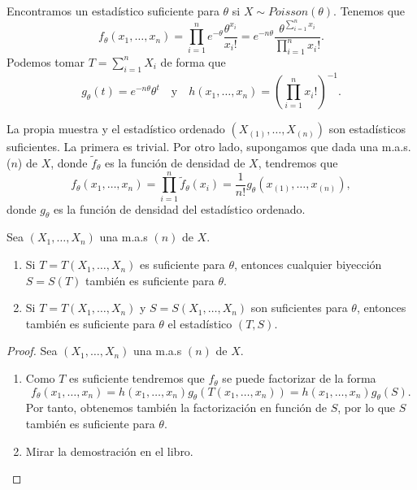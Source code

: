 \begin{eg}[Poisson]
Encontramos un estadístico suficiente para $\displaystyle \theta $ si $\displaystyle X \sim Poisson\left(\theta \right) $. Tenemos que 
\[f_{\theta}\left(x_{1}, \ldots, x_{n}\right)=\prod^{n}_{i=1}e^{-\theta}\frac{\theta^{x_{i}}}{x_{i}!} = e^{-n\theta}\frac{\theta^{\sum^{n}_{i=1}x_{i}}}{\prod^{n}_{i=1}x_{i}!} .\]
Podemos tomar $\displaystyle T = \sum^{n}_{i= 1}X_{i} $ de forma que
\[g_{\theta}\left(t\right)=e^{-n\theta}\theta^{t} \quad \text{y} \quad h\left(x_{1}, \ldots, x_{n}\right)=\left(\prod^{n}_{i=1}x_{i}!\right)^{-1} .\]
\end{eg}
\begin{observation}
	La propia muestra y el estadístico ordenado $\displaystyle \left(X_{\left(1\right)}, \ldots, X_{\left(n\right)}\right) $ son estadísticos suficientes. La primera es trivial. Por otro lado, supongamos que dada una m.a.s. ($\displaystyle n $) de $\displaystyle X $, donde $\displaystyle \tilde{f}_{\theta} $ es la función de densidad de $\displaystyle X $, tendremos que
	\[f_{\theta}\left(x_{1}, \ldots, x_{n}\right) = \prod^{n}_{i=1}\tilde{f}_{\theta}\left(x_{i}\right)=\frac{1}{n!}g_{\theta}\left(x_{\left(1\right)}, \ldots, x_{\left(n\right)}\right) ,\]
	donde $\displaystyle g_{\theta} $ es la función de densidad del estadístico ordenado. 
\end{observation}
\begin{prop}
	Sea $\displaystyle \left(X_{1}, \ldots, X_{n}\right) $ una m.a.s $\displaystyle \left(n\right) $ de $\displaystyle X $.
	\begin{enumerate}
	\item Si $\displaystyle T = T\left(X_{1}, \ldots, X_{n}\right) $ es suficiente para $\displaystyle \theta $, entonces cualquier biyección $\displaystyle S = S\left(T\right) $ también es suficiente para $\displaystyle \theta $.
	\item Si $\displaystyle T=T\left(X_{1}, \ldots, X_{n}\right) $ y $\displaystyle S=S\left(X_{1}, \ldots, X_{n}\right) $ son suficientes para $\displaystyle \theta $, entonces también es suficiente para $\displaystyle \theta $ el estadístico $\displaystyle \left(T,S\right) $. 
	\end{enumerate}
\end{prop}
\begin{proof}
Sea $\displaystyle \left(X_{1}, \ldots, X_{n}\right) $ una m.a.s $\displaystyle \left(n\right) $ de $\displaystyle X $.
\begin{enumerate}
\item Como $\displaystyle T $ es suficiente tendremos que $\displaystyle f_{\theta} $ se puede factorizar de la forma
	\[f_{\theta}\left(x_{1}, \ldots, x_{n}\right)=h\left(x_{1}, \ldots, x_{n}\right)g_{\theta}\left(T\left(x_{1}, \ldots, x_{n}\right)\right) =h\left(x_{1}, \ldots, x_{n}\right)g_{\theta}\left(S\right) .\]
	Por tanto, obtenemos también la factorización en función de $\displaystyle S $, por lo que $\displaystyle S $ también es suficiente para $\displaystyle \theta $. 
\item Mirar la demostración en el libro.	
\end{enumerate}
\end{proof}
